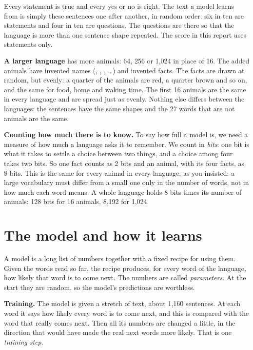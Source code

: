 Every statement is true and every yes or no is right. The text a model learns from is simply
these sentences one after another, in random order: six in ten are statements and four in ten
are questions. The questions are there so that the language is more than one sentence shape
repeated. The score in this report uses statements only.

\textbf{A larger language} has more animals: 64, 256 or 1,024 in place of 16. The added animals
have invented names (, , , \dots) and invented facts. The facts are
drawn at random, but evenly: a quarter of the animals are red, a quarter brown and so on, and
the same for food, home and waking time. The first 16 animals are the same in every language
and are spread just as evenly. Nothing else differs between the languages: the sentences have
the same shapes and the 27 words that are not animals are the same.

\textbf{Counting how much there is to know.} To say how full a model is, we need a measure of
how much a language asks it to remember. We count in \emph{bits}: one bit is what it takes to
settle a choice between two things, and a choice among four takes two bits. So one fact counts
as 2 bits and an animal, with its four facts, as 8 bits. This is the same for every animal in
every language, as you insisted: a large vocabulary must differ from a small one only in the
number of words, not in how much each word means. A whole language holds 8 bits times its
number of animals: 128 bits for 16 animals, 8,192 for 1,024.

\section{The model and how it learns}\label{sec:model}

A model is a long list of numbers together with a fixed recipe for using them. Given the words
read so far, the recipe produces, for every word of the language, how likely that word is to
come next. The numbers are called \emph{parameters}. At the start they are random, so the
model's predictions are worthless.

\textbf{Training.} The model is given a stretch of text, about 1,160 sentences. At each word it
says how likely every word is to come next, and this is compared with the word that really
comes next. Then all its numbers are changed a little, in the direction that would have made
the real next words more likely. That is one \emph{training step}.

